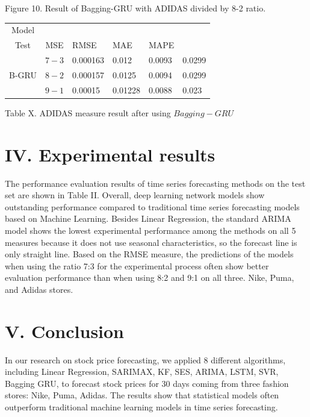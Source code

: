 \documentclass[conference]{IEEEtran}
\begin{document}
{\begin{center}
Figure 10. Result of Bagging-GRU with ADIDAS divided by 8-2 ratio.
\end{center}
\begin{table}[H]
\centering
\begin{tabularx}{\columnwidth}{|c|c|X|X|X|X|}
\hline
Model & \begin{tabular}{c}
Train- \\
Test
\end{tabular} & MSE & RMSE & MAE & MAPE \\
\hline
\multirow{3}{*}{B-GRU} & $7-3$ & 0.000163 & 0.012 & 0.0093 & 0.0299 \\
\cline{2-6}
 & $8-2$ & 0.000157 & 0.0125 & 0.0094 & 0.0299 \\
\cline{2-6}
 & $9-1$ & 0.00015 & 0.01228 & 0.0088 & 0.023 \\
\hline
\end{tabularx}
\end{table}
Table X. ADIDAS measure result after using $Bagging-GRU$


\section*{IV. Experimental results} 
The performance evaluation results of time series forecasting methods on the test set are shown in Table II. Overall, deep learning network models show outstanding performance compared to traditional time series forecasting models based on Machine Learning. Besides Linear Regression, the standard ARIMA model shows the lowest experimental performance among the methods on all 5 measures because it does not use seasonal characteristics, so the forecast line is only straight line. Based on the RMSE measure, the predictions of the models when using the ratio 7:3 for the experimental process often show better evaluation performance than when using 8:2 and 9:1 on all three. Nike, Puma, and Adidas stores.

\section*{V. Conclusion}

In our research on stock price forecasting, we applied 8 different algorithms, including Linear Regression, SARIMAX, KF, SES, ARIMA, LSTM, SVR, Bagging GRU, to forecast stock prices for 30 days coming from three fashion stores: Nike, Puma, Adidas. The results show that statistical models often outperform traditional machine learning models in time series forecasting.

}
\end{document}
